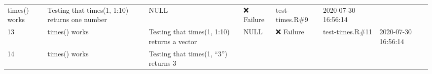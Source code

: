 \documentclass[
]{book}
\begin{document}
\begin{longtable}[]{@{}lllllll@{}}
\begin{minipage}[t]{0.14\columnwidth}
times() works\strut
\end{minipage} & \begin{minipage}[t]{0.25\columnwidth}\raggedright
Testing that times(1, 1:10) returns one number\strut
\end{minipage} & \begin{minipage}[t]{0.05\columnwidth}\raggedright
NULL\strut
\end{minipage} & \begin{minipage}[t]{0.22\columnwidth}\raggedright
❌ Failure\strut
\end{minipage} & \begin{minipage}[t]{0.06\columnwidth}\raggedright
test-times.R\#9\strut
\end{minipage} & \begin{minipage}[t]{0.08\columnwidth}\raggedright
2020-07-30 16:56:14\strut
\end{minipage}\tabularnewline
\begin{minipage}[t]{0.01\columnwidth}\raggedright
13\strut
\end{minipage} & \begin{minipage}[t]{0.14\columnwidth}\raggedright
times() works\strut
\end{minipage} & \begin{minipage}[t]{0.25\columnwidth}\raggedright
Testing that times(1, 1:10) returns a vector\strut
\end{minipage} & \begin{minipage}[t]{0.05\columnwidth}\raggedright
NULL\strut
\end{minipage} & \begin{minipage}[t]{0.22\columnwidth}\raggedright
❌ Failure\strut
\end{minipage} & \begin{minipage}[t]{0.06\columnwidth}\raggedright
test-times.R\#11\strut
\end{minipage} & \begin{minipage}[t]{0.08\columnwidth}\raggedright
2020-07-30 16:56:14\strut
\end{minipage}\tabularnewline
\begin{minipage}[t]{0.01\columnwidth}\raggedright
14\strut
\end{minipage} & \begin{minipage}[t]{0.14\columnwidth}\raggedright
times() works\strut
\end{minipage} & \begin{minipage}[t]{0.25\columnwidth}\raggedright
Testing that times(1, ``3'') returns 3\strut

\end{minipage}
\end{longtable}
\end{document}
